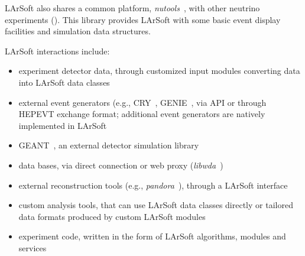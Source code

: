 LArSoft also shares a common platform, \emph{nutools}~\cite{nutools}, with
other neutrino experiments (\NOvA). This library provides LArSoft with
some basic event display facilities and simulation data structures.

LArSoft interactions include:

\begin{itemize}
\item
  experiment detector data, through customized input modules converting
  data into LArSoft data classes
\item
  external event generators (e.g., CRY~\cite{CRY}, GENIE~\cite{GENIE}, via
  API or through HEPEVT exchange format; additional event generators are
  natively implemented in LArSoft
\item
  GEANT~\cite{GEANT}, an external detector simulation library
\item
  data bases, via direct connection or web proxy (\emph{libwda}~\cite{libwda})
\item
  external reconstruction tools (e.g., \emph{pandora}~\cite{pandora}), through a
  LArSoft interface
\item
  custom analysis tools, that can use LArSoft data classes directly or
  tailored data formats produced by custom LArSoft modules
\item
  experiment code, written in the form of LArSoft algorithms, modules
  and services
\end{itemize}

